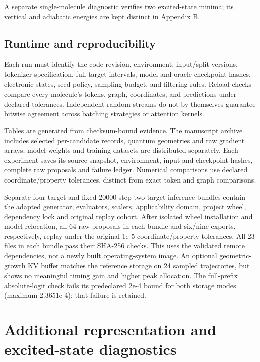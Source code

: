 \documentclass[11pt,a4paper]{article}
\begin{document}
A separate single-molecule diagnostic verifies two excited-state minima;
its vertical and adiabatic energies are kept distinct in Appendix B.

\FloatBarrier
\subsection{Runtime and
reproducibility}\label{runtime-and-reproducibility}

Each run must identify the code revision, environment, input/split
versions, tokenizer specification, full target intervals, model and
oracle checkpoint hashes, electronic states, seed policy, sampling
budget, and filtering rules. Reload checks compare every molecule's
tokens, graph, coordinates, and predictions under declared tolerances.
Independent random streams do not by themselves guarantee bitwise
agreement across batching strategies or attention kernels.

Tables are generated from checksum-bound evidence. The manuscript
archive includes selected per-candidate records, quantum geometries and
raw gradient arrays; model weights and training datasets are distributed
separately. Each experiment saves its source snapshot, environment,
input and checkpoint hashes, complete raw proposals and failure ledger.
Numerical comparisons use declared coordinate/property tolerances,
distinct from exact token and graph comparisons.

Separate four-target and fixed-20000-step two-target inference bundles
contain the adapted generator, evaluators, scalers, applicability
domain, project wheel, dependency lock and original replay cohort. After
isolated wheel installation and model relocation, all 64 raw proposals
in each bundle and six/nine exports, respectively, replay under the
original 1e-5 coordinate/property tolerances. All 23 files in each
bundle pass their SHA-256 checks. This uses the validated remote
dependencies, not a newly built operating-system image. An optional
geometric-growth KV buffer matches the reference storage on 24 sampled
trajectories, but shows no meaningful timing gain and higher peak
allocation. The full-prefix absolute-logit check fails its predeclared
2e-4 bound for both storage modes (maximum 2.3651e-4); that failure is
retained.

\section{Additional representation and excited-state
diagnostics}\label{additional-representation-and-excited-state-diagnostics}
\end{document}
